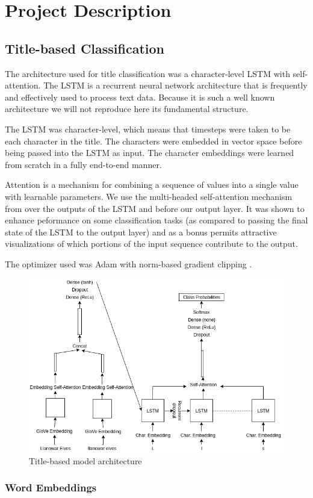 \documentclass[letterpaper]{article} %
\begin{document}
\section{Project Description}

\subsection{Title-based Classification}

The architecture used for title classification
was a character-level LSTM with self-attention.
The LSTM \cite{Hochreiter1997LongSM} is a recurrent neural network architecture
that is frequently and effectively \cite{Schmidhuber2015DeepLI}
used to process text data.
Because it is such a well known architecture
we will not reproduce here its fundamental structure.

The LSTM was character-level,
which means that timesteps were taken to be each character in the title.
The characters were embedded in vector space
before being passed into the LSTM as input.
The character embeddings were learned from scratch
in a fully end-to-end manner.

Attention is a mechanism for combining a sequence of values into a single value
with learnable parameters.
We use the multi-headed self-attention mechanism from \cite{Lin2017ASS}
over the outputs of the LSTM and before our output layer.
It was shown to enhance peformance on some classification tasks
(as compared to passing the final state of the LSTM to the output layer)
and as a bonus permits attractive visualizations
of which portions of the input sequence contribute to the output.

The optimizer used was Adam \cite{Kingma2014AdamAM}
with norm-based gradient clipping \cite{Pascanu2012UnderstandingTE}.

\begin{figure}
  \centering
  \includegraphics[width=.45\textwidth]{text-architecture}
  \caption{Title-based model architecture}
\end{figure}

\subsubsection{Word Embeddings}
\end{document}
